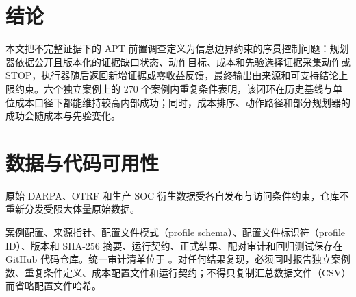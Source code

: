 \documentclass[UTF8,a4paper,twocolumn,zihao=5,fontset=fandol]{ctexart}
\begin{document}
\newpage
\section{结论}

本文把不完整证据下的 APT 前置调查定义为信息边界约束的序贯控制问题：规划器依据公开且版本化的证据缺口状态、动作目标、成本和先验选择证据采集动作或 STOP，执行器随后返回新增证据或零收益反馈，最终输出由来源和可支持结论上限约束。六个独立案例上的 270 个案例内重复条件表明，该闭环在历史基线与单位成本口径下都能维持较高内部成功；同时，成本排序、动作路径和部分规划器的成功会随成本与先验变化。

\section*{数据与代码可用性}

原始 DARPA、OTRF 和生产 SOC 衍生数据受各自发布与访问条件约束，仓库不重新分发受限大体量原始数据。

案例配置、来源指针、配置文件模式（profile schema）、配置文件标识符（profile ID）、版本和 SHA-256 摘要、运行契约、正式结果、配对审计和回归测试保存在 GitHub 代码仓库。统一审计清单位于 。对任何结果复现，必须同时报告独立案例数、重复条件定义、成本配置文件和运行契约；不得只复制汇总数据文件（CSV）而省略配置文件哈希。
\end{document}
